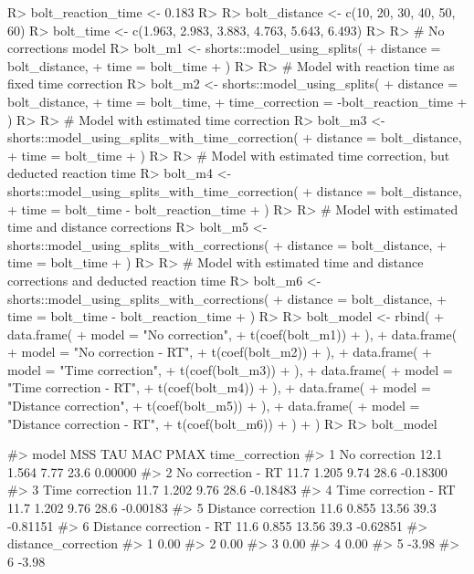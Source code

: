 \documentclass[
]{jss}
\begin{document}
\begin{CodeChunk}
\begin{CodeInput}
R> bolt_reaction_time <- 0.183
R> 
R> bolt_distance <- c(10, 20, 30, 40, 50, 60)
R> bolt_time <- c(1.963, 2.983, 3.883, 4.763, 5.643, 6.493)
R> 
R> # No corrections model
R> bolt_m1 <- shorts::model_using_splits(
+   distance = bolt_distance,
+   time = bolt_time
+ )
R> 
R> # Model with reaction time as fixed time correction
R> bolt_m2 <- shorts::model_using_splits(
+   distance = bolt_distance,
+   time = bolt_time,
+   time_correction = -bolt_reaction_time
+ )
R> 
R> # Model with estimated time correction
R> bolt_m3 <- shorts::model_using_splits_with_time_correction(
+   distance = bolt_distance,
+   time = bolt_time
+ )
R> 
R> # Model with estimated time correction, but deducted reaction time
R> bolt_m4 <- shorts::model_using_splits_with_time_correction(
+   distance = bolt_distance,
+   time = bolt_time - bolt_reaction_time
+ )
R> 
R> # Model with estimated time and distance corrections
R> bolt_m5 <- shorts::model_using_splits_with_corrections(
+   distance = bolt_distance,
+   time = bolt_time
+ )
R> 
R> # Model with estimated time and distance corrections and deducted reaction time
R> bolt_m6 <- shorts::model_using_splits_with_corrections(
+   distance = bolt_distance,
+   time = bolt_time - bolt_reaction_time
+ )
R> 
R> bolt_model <- rbind(
+   data.frame(
+     model = "No correction",
+     t(coef(bolt_m1))
+   ),
+   data.frame(
+     model = "No correction - RT",
+     t(coef(bolt_m2))
+   ),
+   data.frame(
+     model = "Time correction",
+     t(coef(bolt_m3))
+   ),
+   data.frame(
+     model = "Time correction - RT",
+     t(coef(bolt_m4))
+   ),
+   data.frame(
+     model = "Distance correction",
+     t(coef(bolt_m5))
+   ),
+   data.frame(
+     model = "Distance correction - RT",
+     t(coef(bolt_m6))
+   )
+ )
R> 
R> bolt_model
\end{CodeInput}
\begin{CodeOutput}
#>                      model  MSS   TAU   MAC PMAX time_correction
#> 1            No correction 12.1 1.564  7.77 23.6         0.00000
#> 2       No correction - RT 11.7 1.205  9.74 28.6        -0.18300
#> 3          Time correction 11.7 1.202  9.76 28.6        -0.18483
#> 4     Time correction - RT 11.7 1.202  9.76 28.6        -0.00183
#> 5      Distance correction 11.6 0.855 13.56 39.3        -0.81151
#> 6 Distance correction - RT 11.6 0.855 13.56 39.3        -0.62851
#>   distance_correction
#> 1                0.00
#> 2                0.00
#> 3                0.00
#> 4                0.00
#> 5               -3.98
#> 6               -3.98
\end{CodeOutput}
\end{CodeChunk}
\end{document}
